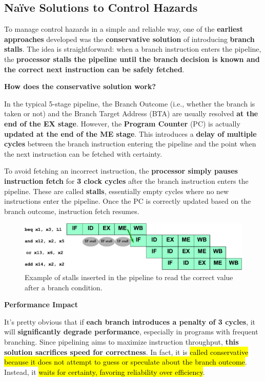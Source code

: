 \subsection{Naïve Solutions to Control Hazards}

To manage control hazards in a simple and reliable way, one of the \textbf{earliest approaches} developed was the \textbf{conservative solution} of introducing \textbf{branch stalls}. The idea is straightforward: when a branch instruction enters the pipeline, the \textbf{processor stalls the pipeline until the branch decision is known and the correct next instruction can be safely fetched}.

\highspace
\begin{flushleft}
    \textcolor{Green3}{ \textbf{How does the conservative solution work?}}
\end{flushleft}
In the typical 5-stage pipeline, the Branch Outcome (i.e., whether the branch is taken or not) and the Branch Target Address (BTA) are usually resolved \textbf{at the end of the EX stage}. However, the \textbf{Program Counter} (PC) is actually \textbf{updated at the end of the ME stage}. This introduces a \textbf{delay of multiple cycles} between the branch instruction entering the pipeline and the point when the next instruction can be fetched with certainty.

\highspace
To avoid fetching an incorrect instruction, the \textcolor{Red2}{\textbf{processor simply pauses instruction fetch}} for \textcolor{Red2}{\textbf{3 clock cycles}} after the branch instruction enters the pipeline. These are called \textbf{stalls}, essentially empty cycles where no new instructions enter the pipeline. Once the PC is correctly updated based on the branch outcome, instruction fetch resumes.

\begin{figure}[!htp]
    \centering
    \includegraphics[width=\textwidth]{img/conservative-solution-control-hazards.pdf}
    \caption{Example of stalls inserted in the pipeline to read the correct value after a branch condition.}
\end{figure}

\begin{flushleft}
    \textcolor{Red2}{ \textbf{Performance Impact}}
\end{flushleft}
It's pretty obvious that if \textbf{each branch introduces a penalty of 3 cycles}, it will \textbf{significantly degrade performance}, especially in programs with frequent branching. Since pipelining aims to maximize instruction throughput, \textbf{this solution sacrifices speed for correctness}. In fact, it is \hl{called conservative because it does not attempt to guess or speculate about the branch outcome}. Instead, it \hl{waits for certainty, favoring reliability over efficiency}.

